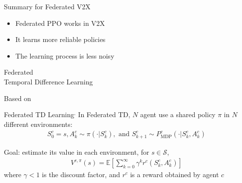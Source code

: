 \documentclass[aspectratio=169,12pt]{beamer}
\begin{document}
\begin{frame}{Summary for Federated V2X}
  \begin{itemize}
  \item Federated PPO works in V2X
  \item It learns more reliable policies
  \item The learning process is less noisy
  \end{itemize}
\end{frame}

\begin{frame}
  \begin{center}
    \textcolor{beamer@blendedblue}{
      \huge Federated \\[1em]
      \huge Temporal Difference Learning
    }
  \end{center}

  \vspace{2em}

  Based on 
\end{frame}




\begin{frame}{Federated TD Learning${}^,$ }
  In Federated TD, $N$ agent use a shared policy $\pi$ in $N$ different environments:
  \begin{align*}
    S_0^c= s, 
    A_k^c \sim \pi(\cdot | S_k^c), 
    \text{ and }
    S_{k+1}^c \sim P^c_{\text{MDP}}(\cdot| S_k^c,A_k^c)
  \end{align*}

  \pause
  
  Goal: estimate its value in each environment, for $s \in \mathcal{S}$,
  \begin{align*}
    V^{c,\pi}(s) = \textstyle{\mathbb{E}\left[\sum_{k=0}^{\infty}\gamma^{k} r^{c}(S_k^c,A_k^c)\right]}
  \end{align*}
  where $\gamma < 1$ is the discount factor, and $r^c$ is a reward obtained by agent $c$

  \vspace{2em}
  
\end{frame}
\end{document}
